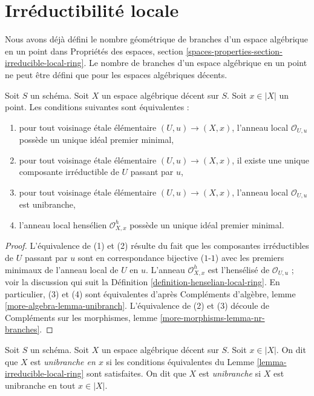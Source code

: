 \section{Irréductibilité locale}
\label{section-irreducible-local-ring}

\noindent
Nous avons déjà défini le nombre géométrique de branches d'un espace
algébrique en un point dans Propriétés des espaces, section
\ref{spaces-properties-section-irreducible-local-ring}.
Le nombre de branches d'un espace algébrique en un point ne peut être défini
que pour les espaces algébriques décents.

\begin{lemma}
\label{lemma-irreducible-local-ring}
Soit $S$ un schéma. Soit $X$ un espace algébrique décent sur $S$.
Soit $x \in |X|$ un point. Les conditions suivantes sont équivalentes :
\begin{enumerate}
\item pour tout voisinage étale élémentaire $(U, u) \to (X, x)$,
l'anneau local $\mathcal{O}_{U, u}$ possède un unique idéal premier minimal,
\item pour tout voisinage étale élémentaire $(U, u) \to (X, x)$,
il existe une unique composante irréductible de $U$ passant par $u$,
\item pour tout voisinage étale élémentaire $(U, u) \to (X, x)$,
l'anneau local $\mathcal{O}_{U, u}$ est unibranche,
\item l'anneau local hensélien $\mathcal{O}_{X, x}^h$ possède un unique idéal
premier minimal.
\end{enumerate}
\end{lemma}

\begin{proof}
L'équivalence de (1) et (2) résulte du fait que les composantes irréductibles
de $U$ passant par $u$ sont en correspondance bijective ($1$-$1$) avec les
premiers minimaux de l'anneau local de $U$ en $u$. L'anneau
$\mathcal{O}_{X, x}^h$ est l'hensélisé de $\mathcal{O}_{U, u}$ ; voir la
discussion qui suit la Définition \ref{definition-henselian-local-ring}.
En particulier, (3) et (4) sont équivalentes d'après Compléments d'algèbre,
lemme \ref{more-algebra-lemma-unibranch}.
L'équivalence de (2) et (3) découle de Compléments sur les morphismes, lemme
\ref{more-morphisms-lemma-nr-branches}.
\end{proof}

\begin{definition}
\label{definition-unibranch}
Soit $S$ un schéma. Soit $X$ un espace algébrique décent sur $S$.
Soit $x \in |X|$. On dit que $X$ est {\it unibranche en $x$} si les
conditions équivalentes du Lemme \ref{lemma-irreducible-local-ring}
sont satisfaites. On dit que $X$ est {\it unibranche} si $X$ est unibranche
en tout $x \in |X|$.
\end{definition}

